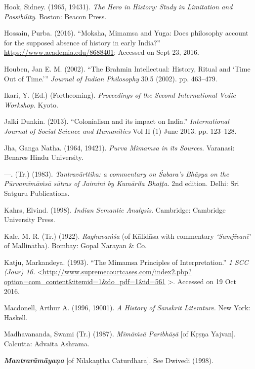 \begin{thebibliography}{99}
  Hook, Sidney. (1965, 19431). \textit{The Hero in History: Study in Limitation and Possibility}. Boston: Beacon Press.

  Hossain, Purba. (2016). “Moksha, Mimamsa and Yuga: Does philosophy account for the supposed absence of history in early India?” \url{https://www.academia.edu/8688401}; Accessed on Sept 23, 2016.

  Houben, Jan E. M. (2002). “The Brahmin Intellectual: History, Ritual and ‘Time Out of Time.’” \textit{Journal of Indian Philosophy} 30.5 (2002). pp. 463–479.

  Ikari, Y. (Ed.) (Forthcoming). \textit{Proceedings of the Second International Vedic Workshop.} Kyoto.

  Jalki Dunkin. (2013). “Colonialism and its impact on India.” \textit{International Journal of Social Science and Humanities} Vol II (1) June 2013. pp. 123–128.

  Jha, Ganga Natha. (1964, 19421). \textit{Purva Mimamsa in its Sources}. Varanasi: Benares Hindu University.

  —. (Tr.) (1983). \textit{Tantravārttika: a commentary on Śabara's Bhāṣya on the Pūrvamīmāṁsā sūtras of Jaimini by Kumārila Bhaṭṭa.} 2nd edition. Delhi: Sri Satguru Publications.

  Kahrs, Elvind. (1998). \textit{Indian Semantic Analysis}. Cambridge: Cambridge University Press.

  Kale, M. R. (Tr.) (1922). \textit{Raghuvaṁśa} (of Kālidāsa with commentary \textit{‘Samjīvanī’} of Mallinātha). Bombay: Gopal Narayan \& Co.

  Katju, Markandeya. (1993). “The Mimamsa Principles of Interpretation.” \textit{1 SCC (Jour) 16.} \textless  \url{http://www.supremecourtcases.com/index2.php?option=com_content&itemid=1&do_pdf=1&id=561} \textgreater . Accessed on 19 Oct 2016.

  Macdonell, Arthur A. (1996, 19001). \textit{A History of Sanskrit Literature}. New York: Haskell.

  Madhavananda, Swami (Tr.) (1987). \textit{Mīmāṁsā Paribhāṣā} [of Kṛṣṇa Yajvan]. Calcutta: Advaita Ashrama.

  \textbf{\textit{Mantrarāmāyaṇa}} [of Nīlakaṇṭha Caturdhara]. See Dwivedi (1998).


\end{thebibliography}
